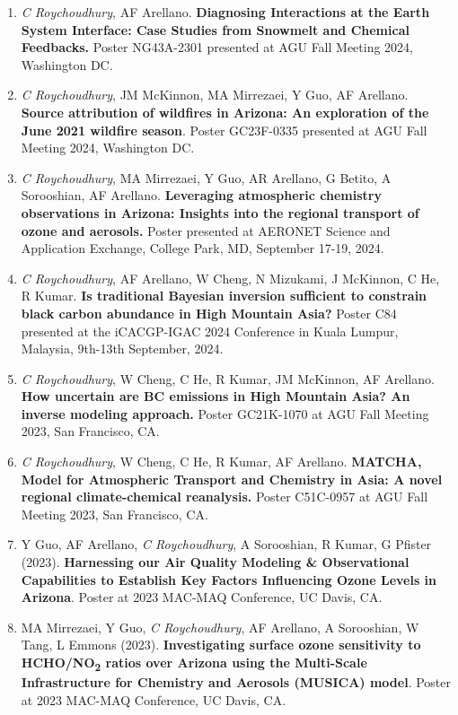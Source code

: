 \documentclass[margin,line]{resume}
\begin{document}
\begin{resume}
\begin{enumerate}[topsep=1pt, partopsep=1pt, itemsep=0.5pt, parsep=0.1pt, leftmargin=15pt,label=\arabic*.]
			\item \textit{C Roychoudhury}, AF Arellano. \textbf{Diagnosing Interactions at the Earth System Interface: Case Studies from Snowmelt and Chemical Feedbacks.} Poster NG43A-2301 presented at AGU Fall Meeting 2024, Washington DC. 
			
			\item \textit{C Roychoudhury}, JM McKinnon, MA Mirrezaei, Y Guo, AF Arellano. \textbf{Source attribution of wildfires in Arizona: An exploration of the June 2021 wildfire season}. Poster GC23F-0335 presented at AGU Fall Meeting 2024, Washington DC. 
			
			\item \textit{C Roychoudhury}, MA Mirrezaei, Y Guo, AR Arellano, G Betito, A Sorooshian, AF Arellano.  \textbf{Leveraging atmospheric chemistry observations in Arizona: Insights into the regional transport of ozone and aerosols.} Poster presented at AERONET Science and Application Exchange, College Park, MD, September 17-19, 2024.
			
			\item \textit{C Roychoudhury}, AF Arellano, W Cheng, N Mizukami, J McKinnon, C He, R Kumar. \textbf{Is traditional Bayesian inversion sufficient to constrain black carbon abundance in High Mountain Asia?} Poster C84 presented at the iCACGP-IGAC 2024 Conference in Kuala Lumpur, Malaysia, 9th-13th September, 2024.
			
			\item \textit{C Roychoudhury}, W Cheng, C He, R Kumar, JM McKinnon, AF Arellano. \textbf{How uncertain are BC emissions in High Mountain Asia? An inverse modeling approach.} Poster GC21K-1070 at AGU Fall Meeting 2023, San Francisco, CA. 
			
			\item \textit{C Roychoudhury}, W Cheng, C He, R Kumar, AF Arellano. \textbf{MATCHA, Model for Atmospheric Transport and Chemistry in Asia: A novel regional climate-chemical reanalysis.} Poster C51C-0957 at AGU Fall Meeting 2023, San Francisco, CA.
			
			\item Y Guo, AF Arellano, \textit{C Roychoudhury}, A Sorooshian, R Kumar, G Pfister (2023). \textbf{Harnessing our Air Quality Modeling \& Observational Capabilities to Establish Key Factors Influencing Ozone Levels in Arizona}. Poster at 2023 MAC-MAQ Conference, UC Davis, CA.
			
			\item MA Mirrezaei, Y Guo, \textit{C Roychoudhury}, AF Arellano, A Sorooshian, W Tang, L Emmons (2023). \textbf{Investigating surface ozone sensitivity to HCHO/NO\textsubscript{2} ratios over Arizona using the Multi-Scale Infrastructure for Chemistry and Aerosols (MUSICA) model}. Poster at 2023 MAC-MAQ Conference, UC Davis, CA.
			

\end{enumerate}
\end{resume}
\end{document}
